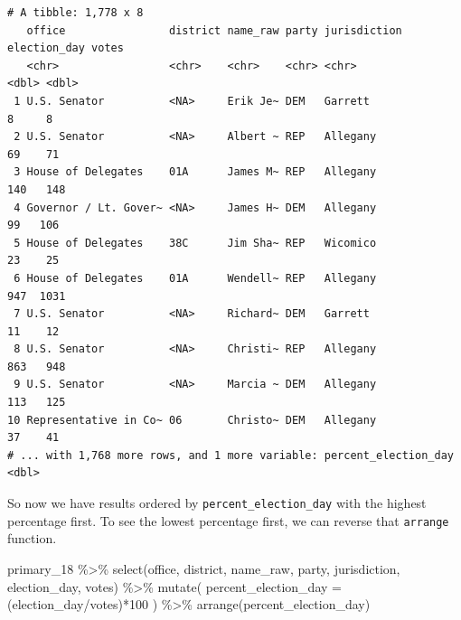 \documentclass[
  letterpaper,
  DIV=11,
  numbers=noendperiod]{scrreprt}
\newenvironment{Shaded}{\begin{snugshade}}{\end{snugshade}}
\newcommand{\AttributeTok}[1]{\textcolor[rgb]{0.40,0.45,0.13}{#1}}
\newcommand{\DecValTok}[1]{\textcolor[rgb]{0.68,0.00,0.00}{#1}}
\newcommand{\FunctionTok}[1]{\textcolor[rgb]{0.28,0.35,0.67}{#1}}
\newcommand{\NormalTok}[1]{\textcolor[rgb]{0.00,0.23,0.31}{#1}}
\newcommand{\SpecialCharTok}[1]{\textcolor[rgb]{0.37,0.37,0.37}{#1}}
\begin{document}
\begin{verbatim}
# A tibble: 1,778 x 8
   office                district name_raw party jurisdiction election_day votes
   <chr>                 <chr>    <chr>    <chr> <chr>               <dbl> <dbl>
 1 U.S. Senator          <NA>     Erik Je~ DEM   Garrett                 8     8
 2 U.S. Senator          <NA>     Albert ~ REP   Allegany               69    71
 3 House of Delegates    01A      James M~ REP   Allegany              140   148
 4 Governor / Lt. Gover~ <NA>     James H~ DEM   Allegany               99   106
 5 House of Delegates    38C      Jim Sha~ REP   Wicomico               23    25
 6 House of Delegates    01A      Wendell~ REP   Allegany              947  1031
 7 U.S. Senator          <NA>     Richard~ DEM   Garrett                11    12
 8 U.S. Senator          <NA>     Christi~ REP   Allegany              863   948
 9 U.S. Senator          <NA>     Marcia ~ DEM   Allegany              113   125
10 Representative in Co~ 06       Christo~ DEM   Allegany               37    41
# ... with 1,768 more rows, and 1 more variable: percent_election_day <dbl>
\end{verbatim}

So now we have results ordered by \texttt{percent\_election\_day} with
the highest percentage first. To see the lowest percentage first, we can
reverse that \texttt{arrange} function.

\begin{Shaded}
\begin{Highlighting}[]
\NormalTok{primary\_18 }\SpecialCharTok{\%\textgreater{}\%}
  \FunctionTok{select}\NormalTok{(office, district, name\_raw, party, jurisdiction, election\_day, votes) }\SpecialCharTok{\%\textgreater{}\%} 
  \FunctionTok{mutate}\NormalTok{(}
  \AttributeTok{percent\_election\_day =}\NormalTok{ (election\_day}\SpecialCharTok{/}\NormalTok{votes)}\SpecialCharTok{*}\DecValTok{100}
\NormalTok{)  }\SpecialCharTok{\%\textgreater{}\%} \FunctionTok{arrange}\NormalTok{(percent\_election\_day)}
\end{Highlighting}
\end{Shaded}
\end{document}
